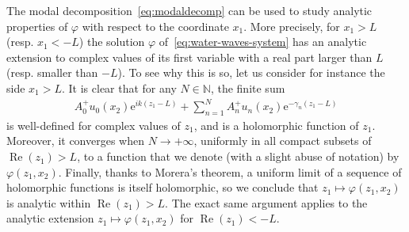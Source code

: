 \documentclass[review,hidelinks,onefignum,onetabnum]{siamart220329}
\newcommand{\e}{\mathrm{e}}
\newcommand{\N}{\mathbb{N}}
\newcommand{\real}{\operatorname{Re}}
\newcommand{\imag}{\operatorname{Im}}
\begin{document}
The modal decomposition~\cref{eq:modaldecomp} can be used to study analytic
properties of $\varphi$ with respect to the coordinate $x_1$. More precisely,
for $x_1>L$ (resp. $x_1<-L$) the solution $\varphi$
of~\cref{eq:water-waves-system} has an analytic extension to complex values of its first variable
with a real part larger than $L$ (resp. smaller than $-L$). To see why this is so, let us consider for instance the side $x_1>L$. It is
clear that for any $N\in\N$, the finite sum
\begin{align}
  A_0^+u_0(x_2)\e^{ik(z_1-L)}+\sum_{n= 1}^NA_n^+u_n(x_2)\e^{-\gamma_n(z_1-L)}
\end{align}
is well-defined for complex values of $z_1$, and is a holomorphic function of
$z_1$. Moreover, it converges when $N\to +\infty$,
uniformly in all compact subsets of $\real(z_1)>L$, to a function that we denote (with a slight abuse of notation) by $\varphi(z_1,x_2)$.  Finally, thanks to Morera's theorem, a uniform limit of a sequence of holomorphic functions is itself holomorphic, so we conclude that  $z_1\mapsto\varphi(z_1,x_2)$ is analytic within $\real(z_1)>L$. The exact same argument applies to the analytic extension $z_1\mapsto\varphi(z_1,x_2)$ for $\real(z_1)<-L$.

\end{document}
